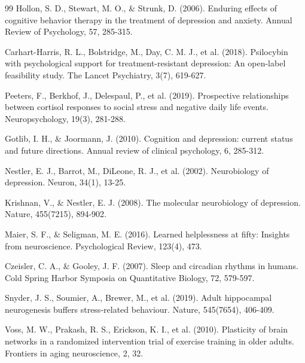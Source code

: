 \documentclass[a4paper,12pt]{article}
\theoremstyle{definition}
\begin{document}
\begin{thebibliography}{99}
 Hollon, S. D., Stewart, M. O., \& Strunk, D. (2006). Enduring effects of cognitive behavior therapy in the treatment of depression and anxiety. Annual Review of Psychology, 57, 285-315.

 Carhart-Harris, R. L., Bolstridge, M., Day, C. M. J., et al. (2018). Psilocybin with psychological support for treatment-resistant depression: An open-label feasibility study. The Lancet Psychiatry, 3(7), 619-627.

 Peeters, F., Berkhof, J., Delespaul, P., et al. (2019). Prospective relationships between cortisol responses to social stress and negative daily life events. Neuropsychology, 19(3), 281-288.

 Gotlib, I. H., \& Joormann, J. (2010). Cognition and depression: current status and future directions. Annual review of clinical psychology, 6, 285-312.

 Nestler, E. J., Barrot, M., DiLeone, R. J., et al. (2002). Neurobiology of depression. Neuron, 34(1), 13-25.

 Krishnan, V., \& Nestler, E. J. (2008). The molecular neurobiology of depression. Nature, 455(7215), 894-902.

 Maier, S. F., \& Seligman, M. E. (2016). Learned helplessness at fifty: Insights from neuroscience. Psychological Review, 123(4), 473.

 Czeisler, C. A., \& Gooley, J. F. (2007). Sleep and circadian rhythms in humans. Cold Spring Harbor Symposia on Quantitative Biology, 72, 579-597.

 Snyder, J. S., Soumier, A., Brewer, M., et al. (2019). Adult hippocampal neurogenesis buffers stress-related behaviour. Nature, 545(7654), 406-409.

 Voss, M. W., Prakash, R. S., Erickson, K. I., et al. (2010). Plasticity of brain networks in a randomized intervention trial of exercise training in older adults. Frontiers in aging neuroscience, 2, 32.

\end{thebibliography}
\end{document}
